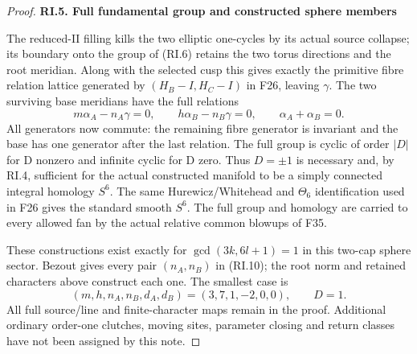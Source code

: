 \begin{proof}
\par

\medskip\noindent\textbf{RI.5. Full fundamental group and constructed sphere members}

\par\nobreak

The reduced-II filling kills the two elliptic one-cycles by its actual
source collapse; its boundary onto the group of (RI.6) retains the two
torus directions and the root meridian. Along with the selected cusp
this gives exactly the primitive fibre relation lattice generated by
\((H_B-I,H_C-I)\) in F26, leaving \(\gamma\). The two surviving base meridians
have the full relations
\[
 m\alpha_A-n_A\gamma=0,\qquad
 h\alpha_B-n_B\gamma=0,\qquad \alpha_A+\alpha_B=0.       \tag{RI.17}
\]
All generators now commute: the remaining fibre generator is invariant
and the base has one generator after the last relation. The full group
is cyclic of order \(|D|\) for D nonzero and infinite cyclic for D zero.
Thus \(D=\pm1\) is necessary and, by RI.4, sufficient for the actual
constructed manifold to be a simply connected integral homology \(S^6\).
The same Hurewicz/Whitehead and \(\Theta_6\) identification used in F26 gives
the standard smooth \(S^6\). The full group and homology are carried to every
allowed fan by the actual relative common blowups of F35.

These constructions exist exactly for \(\gcd(3k,6l+1)=1\) in this two-cap
sphere sector. Bezout gives every pair \((n_A,n_B)\) in (RI.10); the root
norm and retained characters above construct each one. The smallest
case is
\[
 (m,h,n_A,n_B,d_A,d_B)=(3,7,1,-2,0,0),\qquad D=1.        \tag{RI.18}
\]
All full source/line and finite-character maps remain in the proof.
Additional ordinary order-one clutches, moving sites, parameter closing
and return classes have not been assigned by this note.

\end{proof}
